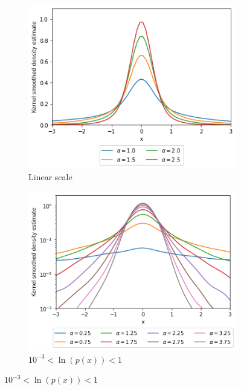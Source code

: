 \documentclass[a4paper]{article}
\begin{document}
\begin{figure}[h]
    \centering
    \begin{subfigure}[b]{0.3\textwidth}
        \centering
        \includegraphics[width=\textwidth]{figures/nonstandard_distribution_ksdensity.png}
        \caption{Linear scale}
        \label{fig:nonstandard_distribution_kernel_smoothed_linear}
    \end{subfigure}
    \hfill
    \begin{subfigure}[b]{0.3\textwidth}
        \centering
        \includegraphics[width=\textwidth]{figures/nonstandard_distribution_ksdensity_log_close.png}
        \caption{$10^{-3} < \ln(p(x)) < 1$}
        \label{fig:nonstandard_distribution_ksdensity_log_close}

\end{subfigure}
\end{figure}
\end{document}
